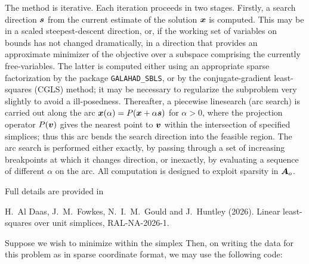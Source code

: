 \documentclass{galahad}
\begin{document}
The method is iterative. Each iteration proceeds in two stages.
Firstly, a search direction ${\bm{s}}$ from the current estimate of the solution
${\bm{x}}$ is computed. This may be in a scaled steepest-descent direction, or,
if the working set of variables on bounds has not changed dramatically,
in a direction that provides an approximate minimizer of the objective
over a subspace comprising the currently free-variables. The latter is
computed either using an appropriate sparse factorization by the
package {\tt GALAHAD\_SBLS}, or by the
conjugate-gradient least-squares (CGLS) method; it may be necessary to
regularize the subproblem very slightly to avoid a ill-posedness.
Thereafter, a piecewise linesearch (arc search) is carried out along
the arc ${\bm{x}}(\alpha) = P( {\bm{x}} + \alpha {\bm{s}})$ for $\alpha > 0$,
where the projection operator $P({\bm{v}})$ gives the nearest point to ${\bm{v}}$ 
within the intersection of specified simplices;
thus this arc bends the search direction into the feasible region.
The arc search is performed either exactly, by passing through a set
of increasing breakpoints at which it changes direction, or inexactly,
by evaluating a sequence of different $\alpha$  on the arc.
All computation is designed to exploit sparsity in ${\bm{A}}_o$.

\vspace*{1mm}

\galreferences
\vspace*{1mm}

\noindent
Full details are provided in
\vspace*{1mm}

\noindent
H.\ Al Daas, J.\ M.\ Fowkes, N.\ I.\ M.\ Gould and J.\ Huntley (2026).
Linear least-squares over unit simplices, RAL-NA-2026-1.


\galexample
Suppose we wish to minimize
within the simplex
Then, on writing the data for this problem as
in sparse coordinate format, we may use the following code:
\end{document}
